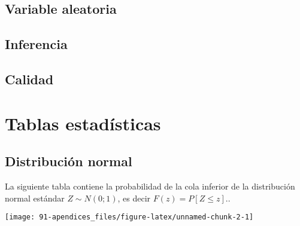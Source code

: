 \documentclass[
]{article}
\begin{document}
\hypertarget{variable-aleatoria}{%
\subsection{Variable aleatoria}\label{variable-aleatoria}}

\hypertarget{inferencia}{%
\subsection{Inferencia}\label{inferencia}}

\hypertarget{calidad}{%
\subsection{Calidad}\label{calidad}}

\hypertarget{tablas}{%
\section{Tablas estadísticas}\label{tablas}}

\hypertarget{distribuciuxf3n-normal}{%
\subsection{Distribución normal}\label{distribuciuxf3n-normal}}

La siguiente tabla contiene la probabilidad de la cola inferior de la
distribución normal estándar \(Z\sim N(0;1)\), es decir
\(F(z)=P[Z\leq z].\).

\texttt{[image: 91-apendices\_files/figure-latex/unnamed-chunk-2-1]}
\end{document}
